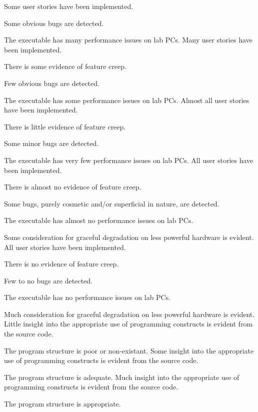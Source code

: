\documentclass{../../fal_assignment}
\begin{document}
\begin{markingrubric}
        \grade Some user stories have been implemented.
            \par Some obvious bugs are detected.
            \par The executable has many performance issues on lab PCs.
        \grade Many user stories have been implemented.
            \par There is some evidence of feature creep.
            \par Few obvious bugs  are detected.
            \par The executable has some performance issues on lab PCs.
        \grade Almost all user stories have been implemented.
            \par There is little evidence of feature creep.
            \par Some minor bugs  are detected.
            \par The executable has very few performance issues on lab PCs.
        \grade All user stories have been implemented.
            \par There is almost no evidence of feature creep.
            \par Some bugs, purely cosmetic and/or superficial in nature, are detected.
            \par The executable has almost no performance issues on lab PCs.
            \par Some consideration for graceful degradation on less powerful hardware is evident.
        \grade All user stories have been implemented.
            \par There is no evidence of feature creep.
            \par Few to no bugs are detected.
            \par The executable has no performance issues on lab PCs.
            \par Much consideration for graceful degradation on less powerful hardware is evident.
%
        \grade \fail Little insight into the appropriate use of programming constructs is evident from the source code.
            \par The program structure is poor or non-existant.
        \grade Some insight into the appropriate use of programming constructs is evident from the source code.
            \par The program structure is adequate.
        \grade Much insight into the appropriate use of programming constructs is evident from the source code.
            \par The program structure is appropriate.

\end{markingrubric}
\end{document}
